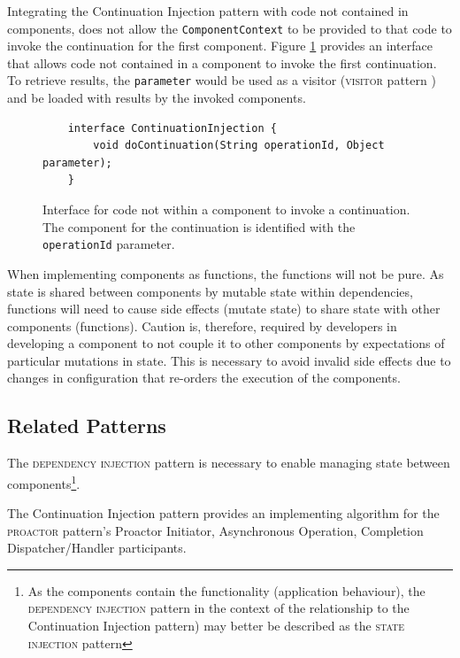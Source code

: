 \documentclass[prodmode]{style/acmlarge}
\begin{document}
Integrating the Continuation Injection pattern with code not contained in
components, does not allow the \texttt{ComponentContext} to be provided to that
code to invoke the continuation for the first component.  Figure
\ref{fig:ContinuationInjectionInterface} provides an interface that allows code
not contained in a component to invoke the first continuation.  To retrieve
results, the \texttt{parameter} would be used as a visitor (\textsc{visitor}
pattern \cite{gof}) and be loaded with results by the invoked components.

\begin{figure}[tp]
\begin{verbatim}
    interface ContinuationInjection {
        void doContinuation(String operationId, Object parameter);
    }
\end{verbatim}
\caption{Interface for code not within a component to invoke a continuation.  The component for the continuation is identified with the \texttt{operationId} parameter.}
\label{fig:ContinuationInjectionInterface}
\end{figure}

When implementing components as functions, the functions will not be pure.  As
state is shared between components by mutable state within dependencies,
functions will need to cause side effects (mutate state) to share state with
other components (functions).  Caution is, therefore, required by developers in
developing a component to not couple it to other components by expectations of
particular mutations in state.  This is necessary to avoid invalid side effects
due to changes in configuration that re-orders the execution of the components.


\subsection{Related Patterns}

The \textsc{dependency injection} pattern \cite{ioc} is necessary to enable
managing state between components\footnote{As the components contain the
functionality (application behaviour), the \textsc{dependency injection} pattern
in the context of the relationship to the Continuation Injection pattern) may
better be described as the \textsc{state injection} pattern}.

The Continuation Injection pattern provides an implementing algorithm for the
\textsc{proactor} pattern's Proactor Initiator, Asynchronous Operation, Completion
Dispatcher/Handler participants.
\end{document}
